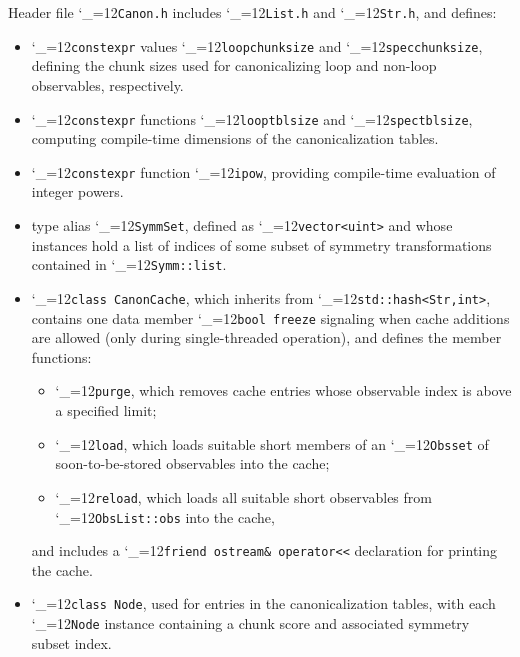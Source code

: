 \documentclass [12pt]{article}
\makeatletter
\renewcommand{\tt}{\begingroup\catcode`_=12\def\_{\string_}\tt@}
\newcommand{\tt@}[1]{\texttt{#1}\endgroup}
\makeatother
\begin{document}
Header file \tt{Canon.h} includes
\tt{List.h} and
\tt{Str.h},
and defines:
\begin{itemize}\advance\itemsep -3pt
\item
    \tt{constexpr} values
    \tt{loopchunksize} and \tt{specchunksize},
    defining the chunk sizes used for canonicalizing loop
    and non-loop observables, respectively.

\item
    \tt{constexpr} functions
    \tt{looptblsize} and \tt{spectblsize},
    computing compile-time dimensions of the
    canonicalization tables.

\item
    \tt{constexpr} function \tt{ipow}, providing
    compile-time evaluation of integer powers.

\item
    type alias \tt{SymmSet}, defined as \tt{vector<uint>}
    and whose instances hold a list of indices
    of some subset of symmetry transformations contained
    in \tt{Symm::list}.

\item
    \tt{class CanonCache}, which inherits
    from \tt{std::hash<Str,int>},
    contains one data member
    \tt{bool freeze} signaling when cache
    additions are allowed (only during
    single-threaded operation),
    and defines the member functions:
    \begin{itemize}
    \item
	\tt{purge}, which removes cache entries whose
	observable index is above a specified limit;
    \item
	\tt{load}, which loads suitable short members
	of an \tt{Obsset} of soon-to-be-stored observables
	into the cache;
    \item
	\tt{reload}, which loads all suitable short
	observables from \tt{ObsList::obs} into the cache,
    \end{itemize}
    and includes a \tt{friend ostream\& operator<<} declaration
    for printing the cache.

\item
    \tt{class Node}, used for entries in the
    canonicalization tables, with each \tt{Node}
    instance containing a chunk score and associated
    symmetry subset index.


\end{itemize}
\end{document}
